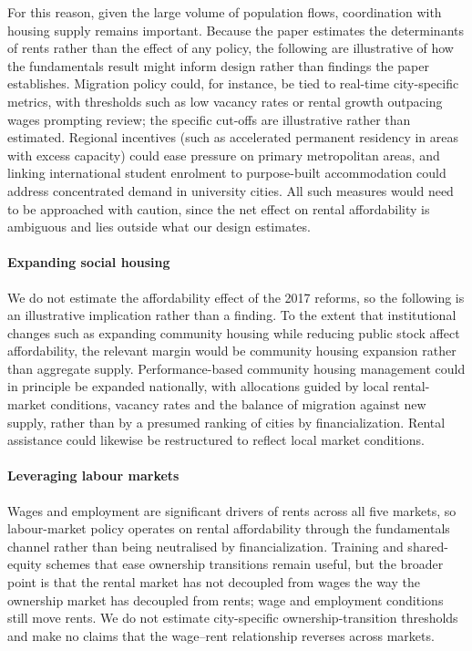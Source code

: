 \documentclass[preprint,11pt,authoryear]{elsarticle}
\begin{document}
For this reason, given the large volume of population flows, coordination
with housing supply remains important. Because the paper estimates the
determinants of rents rather than the effect of any policy, the
following are illustrative of how the fundamentals result might inform
design rather than findings the paper establishes. Migration policy
could, for instance, be tied to real-time city-specific metrics, with
thresholds such as low vacancy rates or rental growth outpacing wages
prompting review; the specific cut-offs are illustrative rather than
estimated. Regional incentives (such as accelerated
permanent residency in areas with excess capacity) could ease pressure
on primary metropolitan areas, and linking international student
enrolment to purpose-built accommodation could address concentrated
demand in university cities. All such measures would need to be
approached with caution, since the net effect on rental affordability is
ambiguous and lies outside what our design estimates.

\paragraph{Expanding social housing}
We do not estimate the affordability effect of the 2017 reforms, so the
following is an illustrative implication rather than a finding. To the
extent that institutional changes such as expanding community housing
while reducing public stock affect affordability, the relevant margin
would be community housing expansion rather than aggregate supply.
Performance-based community housing management could in principle be
expanded nationally, with allocations
guided by local rental-market conditions, vacancy rates and the balance
of migration against new supply, rather than by a presumed ranking of
cities by financialization. Rental assistance could likewise be
restructured to reflect local market conditions.

\paragraph{Leveraging labour markets}
Wages and employment are significant drivers of rents across all five
markets, so labour-market policy operates on rental affordability
through the fundamentals channel rather than being neutralised by
financialization. Training and shared-equity schemes that ease
ownership transitions remain useful, but the broader point is that the
rental market has not decoupled from wages the way the ownership market
has decoupled from rents; wage and employment conditions still move
rents. We do not estimate city-specific ownership-transition thresholds
and make no claims that the wage--rent relationship reverses across
markets.
\end{document}

